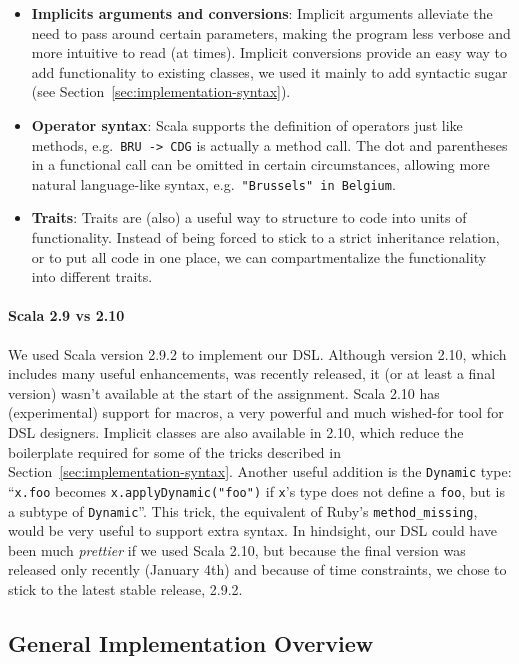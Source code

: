 \documentclass[a4paper]{article}
\newcommand{\cc}[1]{\texttt{#1}}
\renewcommand{\sc}[1]{\lstinline{#1}}
\begin{document}
\begin{itemize}
\item \textbf{Implicits arguments and conversions}:
  Implicit arguments alleviate the need to pass around certain parameters, making the program less verbose and more intuitive to read (at times).
  Implicit conversions provide an easy way to add functionality to existing classes, we used it mainly to add syntactic sugar (see Section~\ref{sec:implementation-syntax}).
\item \textbf{Operator syntax}:
  Scala supports the definition of operators just like methods, e.g.\ \sc{BRU -> CDG} is actually a method call.
  The dot and parentheses in a functional call can be omitted in certain circumstances, allowing more natural language-like syntax, e.g.\ \sc{"Brussels" in Belgium}.
\item \textbf{Traits}:
  Traits are (also) a useful way to structure to code into units of functionality.
  Instead of being forced to stick to a strict inheritance relation, or to put all code in one place, we can compartmentalize the functionality into different traits.
\end{itemize}

\paragraph{Scala 2.9 vs 2.10}

We used Scala version 2.9.2 to implement our DSL.
Although version 2.10, which includes many useful enhancements, was recently released, it (or at least a final version) wasn't available at the start of the assignment.
Scala 2.10 has (experimental) support for macros, a very powerful and much wished-for tool for DSL designers.
Implicit classes are also available in 2.10, which reduce the boilerplate required for some of the tricks described in Section~\ref{sec:implementation-syntax}.
Another useful addition is the \cc{Dynamic} type: ``\sc{x.foo} becomes \sc{x.applyDynamic("foo")} if \sc{x}'s type does not define a \sc{foo}, but is a subtype of \cc{Dynamic}''.
This trick, the equivalent of Ruby's \cc{method\_missing}, would be very useful to support extra syntax.
In hindsight, our DSL could have been much \emph{prettier} if we used Scala 2.10, but because the final version was released only recently (January 4th) and because of time constraints, we chose to stick to the latest stable release, 2.9.2.


\subsection{General Implementation Overview}
\label{sec:general-implementation-overview}
\end{document}
